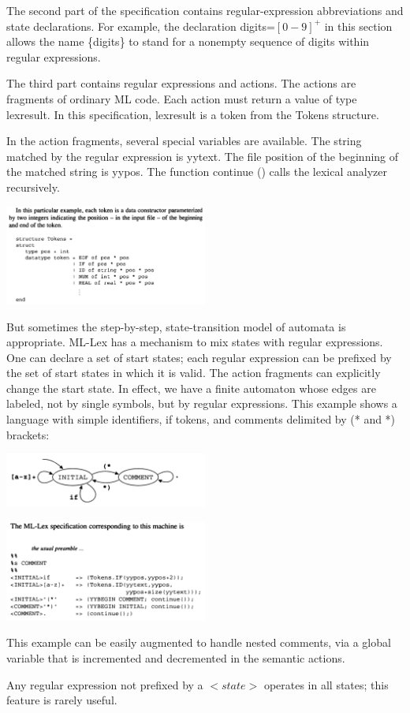 \documentclass[8pt, a4paper, oneside, twocolumn]{extarticle}
\begin{document}
The second part of the specification contains regular-expression  
abbreviations and state declarations. For example, the declaration digits=$[0-9]^+$ 
in this section allows the name \{digits\} to stand for a nonempty sequence 
of digits within regular expressions. 

The third part contains regular expressions and actions. The actions are 
fragments of ordinary ML code. Each action must return a value of type 
lexresult. In this specification, lexresult is a token from the Tokens 
structure. 

In the action fragments, several special variables are available. The string 
matched by the regular expression is yytext. The file position of the  
beginning of the matched string is yypos. The function continue () calls the 
lexical analyzer recursively. 

\includegraphics[width=0.5\textwidth,height=0.5\textheight,keepaspectratio]{lex2}

But sometimes the step-by-step, state-transition model of automata is  
appropriate. ML-Lex has a mechanism to mix states with regular expressions. 
One can declare a set of start states; each regular expression can be prefixed 
by the set of start states in which it is valid. The action fragments can  
explicitly change the start state. In effect, we have a finite automaton whose edges 
are labeled, not by single symbols, but by regular expressions. This example 
shows a language with simple identifiers, if tokens, and comments delimited 
by (* and *) brackets: 

\includegraphics[width=0.5\textwidth,height=0.5\textheight,keepaspectratio]{lex3}

\includegraphics[width=0.5\textwidth,height=0.5\textheight,keepaspectratio]{lex4}

This example can be easily augmented to handle nested comments, via a 
global variable that is incremented and decremented in the semantic actions. 

Any regular expression not prefixed by a $<state>$ operates in all states; this  
feature is rarely useful. 
\end{document}
